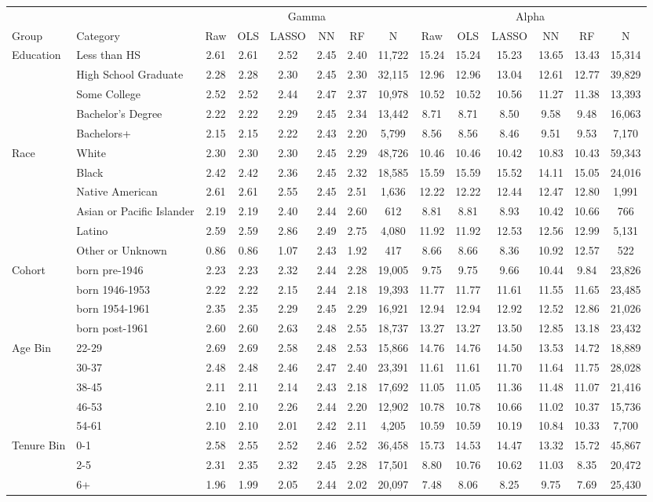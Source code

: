 \begin{tabular}{llcccccc|cccccc}
\hline\hline
 &  & \multicolumn{6}{c|}{Gamma} & \multicolumn{6}{c}{Alpha} \\
Group & Category & Raw & OLS & LASSO & NN & RF & N & Raw & OLS & LASSO & NN & RF & N \\
\hline
Education&Less than HS&2.61&2.61&2.52&2.45&2.40&11,722&15.24&15.24&15.23&13.65&13.43&15,314\\
&High School Graduate&2.28&2.28&2.30&2.45&2.30&32,115&12.96&12.96&13.04&12.61&12.77&39,829\\
&Some College&2.52&2.52&2.44&2.47&2.37&10,978&10.52&10.52&10.56&11.27&11.38&13,393\\
&Bachelor's Degree&2.22&2.22&2.29&2.45&2.34&13,442&8.71&8.71&8.50&9.58&9.48&16,063\\
&Bachelors+&2.15&2.15&2.22&2.43&2.20&5,799&8.56&8.56&8.46&9.51&9.53&7,170\\
Race&White&2.30&2.30&2.30&2.45&2.29&48,726&10.46&10.46&10.42&10.83&10.43&59,343\\
&Black&2.42&2.42&2.36&2.45&2.32&18,585&15.59&15.59&15.52&14.11&15.05&24,016\\
&Native American&2.61&2.61&2.55&2.45&2.51&1,636&12.22&12.22&12.44&12.47&12.80&1,991\\
&Asian or Pacific Islander&2.19&2.19&2.40&2.44&2.60&612&8.81&8.81&8.93&10.42&10.66&766\\
&Latino&2.59&2.59&2.86&2.49&2.75&4,080&11.92&11.92&12.53&12.56&12.99&5,131\\
&Other or Unknown&0.86&0.86&1.07&2.43&1.92&417&8.66&8.66&8.36&10.92&12.57&522\\
Cohort&born pre-1946&2.23&2.23&2.32&2.44&2.28&19,005&9.75&9.75&9.66&10.44&9.84&23,826\\
&born 1946-1953&2.22&2.22&2.15&2.44&2.18&19,393&11.77&11.77&11.61&11.55&11.65&23,485\\
&born 1954-1961&2.35&2.35&2.29&2.45&2.29&16,921&12.94&12.94&12.92&12.52&12.86&21,026\\
&born post-1961&2.60&2.60&2.63&2.48&2.55&18,737&13.27&13.27&13.50&12.85&13.18&23,432\\
Age Bin&22-29&2.69&2.69&2.58&2.48&2.53&15,866&14.76&14.76&14.50&13.53&14.72&18,889\\
&30-37&2.48&2.48&2.46&2.47&2.40&23,391&11.61&11.61&11.70&11.64&11.75&28,028\\
&38-45&2.11&2.11&2.14&2.43&2.18&17,692&11.05&11.05&11.36&11.48&11.07&21,416\\
&46-53&2.10&2.10&2.26&2.44&2.20&12,902&10.78&10.78&10.66&11.02&10.37&15,736\\
&54-61&2.10&2.10&2.01&2.42&2.11&4,205&10.59&10.59&10.19&10.84&10.33&7,700\\
Tenure Bin&0-1&2.58&2.55&2.52&2.46&2.52&36,458&15.73&14.53&14.47&13.32&15.72&45,867\\
&2-5&2.31&2.35&2.32&2.45&2.28&17,501&8.80&10.76&10.62&11.03&8.35&20,472\\
&6+&1.96&1.99&2.05&2.44&2.02&20,097&7.48&8.06&8.25&9.75&7.69&25,430\\
\hline\hline
\end{tabular}

